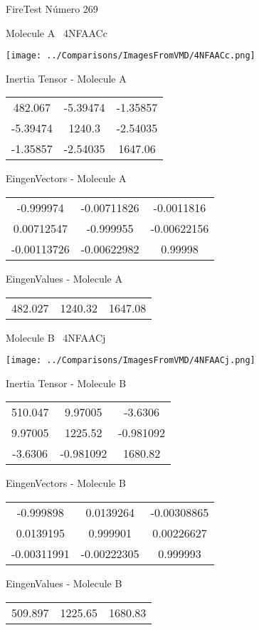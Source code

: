 \vtab[-3cm]
\begin{center}
{\large FireTest \tab Número 269}
\end{center}
\begin{multicols}{2}
\begin{center}

Molecule A \
4NFAACc

\texttt{[image: ../Comparisons/ImagesFromVMD/4NFAACc.png]}

Inertia Tensor - Molecule A \\
\begin{tabular}{|c c c|}
482.067	 & 	-5.39474	 & 	-1.35857	 \\
-5.39474	 & 	1240.3	 & 	-2.54035	 \\
-1.35857	 & 	-2.54035	 & 	1647.06
\end{tabular}

\vtab
 EingenVectors - Molecule A     \\
\begin{tabular}{|c c c|}
-0.999974	 & 	-0.00711826	 & 	-0.0011816	 \\
0.00712547	 & 	-0.999955	 & 	-0.00622156	 \\
-0.00113726	 & 	-0.00622982	 & 	0.99998
\end{tabular}

\vtab
 EingenValues - Molecule A     \\
\begin{tabular}{|c c c|}
482.027	 & 	1240.32	 & 	1647.08	 \\
\end{tabular}
\columnbreak

Molecule B \
4NFAACj

\texttt{[image: ../Comparisons/ImagesFromVMD/4NFAACj.png]}

Inertia Tensor - Molecule B \\
\begin{tabular}{|c c c|}
510.047	 & 	9.97005	 & 	-3.6306	 \\
9.97005	 & 	1225.52	 & 	-0.981092	 \\
-3.6306	 & 	-0.981092	 & 	1680.82
\end{tabular}

\vtab
 EingenVectors - Molecule B     \\
\begin{tabular}{|c c c|}
-0.999898	 & 	0.0139264	 & 	-0.00308865	 \\
0.0139195	 & 	0.999901	 & 	0.00226627	 \\
-0.00311991	 & 	-0.00222305	 & 	0.999993
\end{tabular}

\vtab
 EingenValues - Molecule B     \\
\begin{tabular}{|c c c|}
509.897	 & 	1225.65	 & 	1680.83	 \\
\end{tabular}

\end{center}
\end{multicols}

